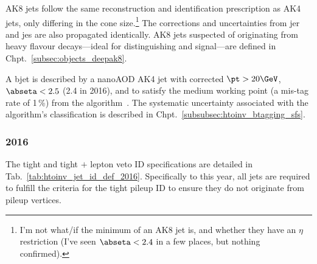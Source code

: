 AK8 \glspl{jet} follow the same reconstruction and identification prescription as AK4 \glspl{jet}, only differing in the cone size.\footnote{I'm not what/if the minimum \pt of an AK8 \gls{jet} is, and whether they have an $\eta$ restriction (I've seen $\abseta < 2.4$ in a few places, but nothing confirmed).} The corrections and uncertainties from \acrshort{jer} and \acrshort{jes} are also propagated identically. AK8 \glspl{jet} suspected of originating from heavy flavour decays---ideal for distinguishing \ttH and \VH signal---are defined in Chpt.~\ref{subsec:objects_deepak8}.

A \gls{bjet} is described by a nanoAOD AK4 \gls{jet} with corrected $\pt > \text{20}\GeV$, $\abseta < \text{2.5}$ (2.4 in 2016), and to satisfy the medium working point (a mis-tag rate of 1\,\%) from the \deepcsv algorithm~\cite{Sirunyan:2017ezt}. The systematic uncertainty associated with the algorithm's classification is described in Chpt.~\ref{subsubsec:htoinv_btagging_sfs}.




\subsubsection{2016}
\label{subsubsec:objects_jets_2016}

The tight and tight $+$ lepton veto ID specifications are detailed in Tab.~\ref{tab:htoinv_jet_id_def_2016}. Specifically to this year, all \glspl{jet} are required to fulfill the criteria for the tight pileup ID to ensure they do not originate from pileup vertices.

